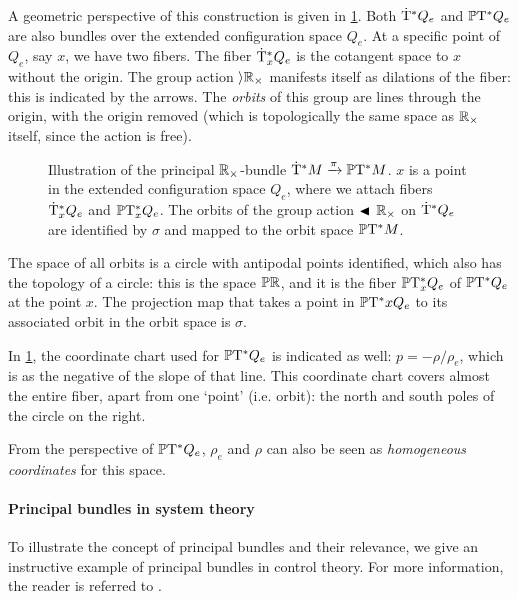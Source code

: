 A geometric perspective of this construction is given in \cref{fig:principal_bundle}. Both \(\mathrm{\dot{T}}^*Q_e\) and \(\mathbb{P}\mathrm{T}^* Q_e\) are also bundles over the extended configuration space \(Q_e\). At a specific point of \(Q_e\), say \(x\), we have two fibers. The fiber \(\mathrm{\dot{T}}^*_{x} Q_e\) is the cotangent space to \(x\) without the origin. The group action \(\rangle{\ensuremath{\mathbb{R}_{\times}}}\) manifests itself as dilations of the fiber: this is indicated by the arrows. The \emph{orbits} of this group are lines through the origin, with the origin removed (which is topologically the same space as \(\mathbb{R}_{\times}\) itself, since the action is free). 
\begin{figure}[ht!]
    \centering
    
    \caption{Illustration of the principal \(\mathbb{R}_{\times}\)-bundle \(\mathrm{\dot{T}}^*M\xrightarrow[]{\pi}\mathbb{P}\mathrm{T}^* M\). \(x\) is a point in the extended configuration space \(Q_e\), where we attach fibers \(\mathrm{\dot{T}}^*_{x} Q_e\) and \(\mathbb{P}\mathrm{T}^*_{x} Q_e\). The orbits of the group action \(\blacktriangleleft\,\mathbb{R}_{\times}\) on \(\mathrm{\dot{T}}^*Q_e\) are identified by \(\sigma\) and mapped to the orbit space \(\mathbb{P}\mathrm{T}^* M\). }
    \label{fig:principal_bundle}
\end{figure}

The space of all orbits is a circle with antipodal points identified, which also has the topology of a circle: this is the space \(\mathbb{P}\mathbb{R}\), and it is the fiber \(\mathbb{P}\mathrm{T}^*_{x} Q_e\) of \(\mathbb{P}\mathrm{T}^* Q_e\) at the point \(x\). The projection map that takes a point in \(\mathbb{P}\mathrm{T}^* x{Q_e}\) to its associated orbit in the orbit space is \(\sigma\). 

In \cref{fig:principal_bundle}, the coordinate chart used for \(\mathbb{P}\mathrm{T}^* Q_e\) is indicated as well: \(p = -\rho/\rho_e\), which is as the negative of the slope of that line. This coordinate chart covers almost the entire fiber, apart from one `point' (i.e. orbit): the north and south poles of the circle on the right.

From the perspective of \(\mathbb{P}\mathrm{T}^* Q_e\), \(\rho_e\) and \(\rho\) can also be seen as \emph{homogeneous coordinates} for this space.

\paragraph{Principal bundles in system theory}
To illustrate the concept of principal bundles and their relevance, we give an instructive example of principal bundles in control theory. For more information, the reader is referred to \citet{Hermann1984}. 


